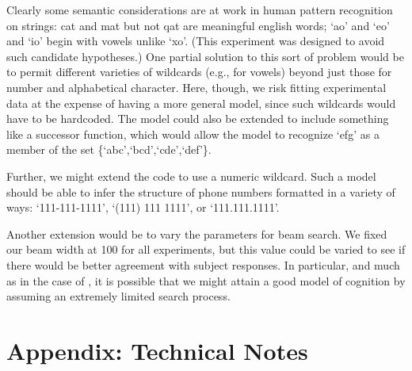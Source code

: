 \documentclass[10pt,letterpaper]{article}
\begin{document}
Clearly some semantic considerations are at work in human pattern recognition on strings: cat and mat but not qat are meaningful english words; `ao' and `eo' and `io' begin with vowels unlike `xo'. (This experiment was designed to avoid such candidate hypotheses.) One partial solution to this sort of problem would be to permit different varieties of wildcards (e.g., for vowels) beyond just those for number and alphabetical character. Here, though, we risk fitting experimental data at the expense of having a more general model, since such wildcards would have to be hardcoded. The model could also be extended to include something like a successor function, which would allow the model to recognize `efg' as a member of the set \{`abc',`bcd',`cde',`def'\}.

Further, we might extend the code to use a numeric wildcard. Such a model should be able to infer the structure of phone numbers formatted in a variety of ways: `111-111-1111', `(111) 111 1111', or `111.111.1111'.

Another extension would be to vary the parameters for beam search. We fixed our beam width at 100 for all experiments, but this value could be varied to see if there would be better agreement with subject responses. In particular, and much as in the case of , it is possible that we might attain a good model of cognition by assuming an extremely limited search process.




\setlength{\bibleftmargin}{.125in}
\setlength{\bibindent}{-\bibleftmargin}


\section{Appendix: Technical Notes}
\end{document}
